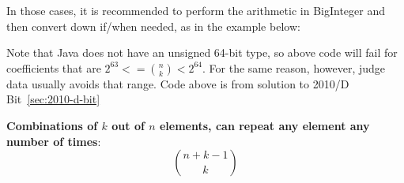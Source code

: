 In those cases, it is recommended to perform the arithmetic in BigInteger and then convert
down if/when needed, as in the example below:


Note that Java does not have an unsigned 64-bit type, so above code will fail for 
coefficients that are $2^{63} <= \binom{n}{k} < 2^{64}$.  
For the same reason, however, judge data usually avoids that range.
Code above is from solution to 2010/D Bit~\ref{sec:2010-d-bit}

\textbf{Combinations of $k$ out of $n$ elements, can repeat any element any number of times}:
\[
    \binom{n + k - 1}{k}
\]

